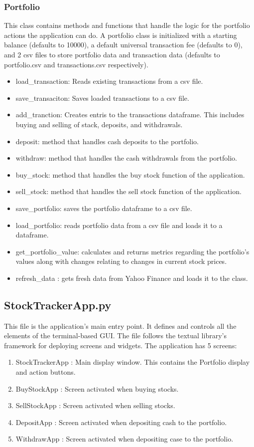 \documentclass{article}
\begin{document}
\subsubsection{Portfolio}
This class contains methods and functions that handle the logic for the portfolio actions the application can do. A portfolio class is initialized with a starting balance (defaults to 10000), a default universal transaction fee (defaults to 0), and 2 csv files to store portfolio data and transaction data (defaults to portfolio.csv and transactions.csv respectively). 
\begin{itemize}
    \item load{\_}transaction:  Reads existing transactions from a csv file.
    \item save{\_}transaciton: Saves loaded transactions to a csv file.
    \item add{\_}tranction: Creates entris to the transactions dataframe. This includes buying and selling of stack, deposits, and withdrawals. 
    \item deposit: method that handles cash deposits to the portfolio.
    \item withdraw: method that handles the cash withdrawals from the portfolio.
    \item buy{\_}stock: method that handles the buy stock function of the application. 
    \item sell{\_}stock: method that handles the sell stock function of the application. 
    \item save{\_}portfolio: saves the portfolio dataframe to a csv file.
    \item load{\_}portfolio: reads portfolio data from a csv file and loads it to a dataframe.
    \item get{\_}portfolio{\_}value: calculates and returns metrics regarding the portfolio's values along with changes relating to changes in current stock prices.
    \item refresh{\_}data : gets fresh data from Yahoo Finance and loads it to the class. 
\end{itemize}

\subsection{StockTrackerApp.py}
This file is the application's main entry point. It defines and controls all the elements of the terminal-based GUI. The file follows the textual library's framework for deploying screens and widgets. The application has 5 screens:
\begin{enumerate}
    \item StockTrackerApp : Main display window. This contains the Portfolio display and action buttons. 
    \item BuyStockApp : Screen activated when buying stocks.
    \item SellStockApp : Screen activated when selling stocks. 
    \item DepositApp : Screen activated when depositing cash to the portfolio.
    \item WithdrawApp : Screen activated when depositing case to the portfolio. 
\end{enumerate}
\end{document}
